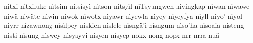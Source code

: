 nìtxi\hspace{2mm}
nìtxiluke\hspace{2mm}
nìtsim\hspace{2mm}
nìtsìsyì\hspace{2mm}
nìtson\hspace{2mm}
nìtsyìl\hspace{2mm}
nìTsyungwen\hspace{2mm}
nìvingkap\hspace{2mm}
nìwan\hspace{2mm}
nìwawe\hspace{2mm}
nìwä\hspace{2mm}
nìwäte\hspace{2mm}
nìwin\hspace{2mm}
nìwok\hspace{2mm}
nìwotx\hspace{2mm}
nìyawr\hspace{2mm}
nìyewla\hspace{2mm}
nìyey\hspace{2mm}
nìyeyfya\hspace{2mm}
nìyll\hspace{2mm}
nìyo'\hspace{2mm}
nìyol\hspace{2mm}
nìyrr\hspace{2mm}
nìzawnong\hspace{2mm}
nìsìlpey\hspace{2mm}
nìskien\hspace{2mm}
nìslele\hspace{2mm}
nìsngä'i\hspace{2mm}
nìsngum\hspace{2mm}
nìso'ha\hspace{2mm}
nìsoaia\hspace{2mm}
nìsteng\hspace{2mm}
nìsti\hspace{2mm}
nìsung\hspace{2mm}
nìswey\hspace{2mm}
nìsyayvi\hspace{2mm}
nìsyen\hspace{2mm}
nìsyep\hspace{2mm}
nokx\hspace{2mm}
nong\hspace{2mm}
nopx\hspace{2mm}
nrr\hspace{2mm}
nrra\hspace{2mm}
nuä\hspace{2mm}
